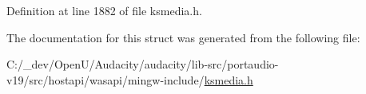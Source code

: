 Definition at line 1882 of file ksmedia.\+h.



The documentation for this struct was generated from the following file\+:\begin{DoxyCompactItemize}
\item 
C\+:/\+\_\+dev/\+Open\+U/\+Audacity/audacity/lib-\/src/portaudio-\/v19/src/hostapi/wasapi/mingw-\/include/\hyperlink{ksmedia_8h}{ksmedia.\+h}\end{DoxyCompactItemize}
